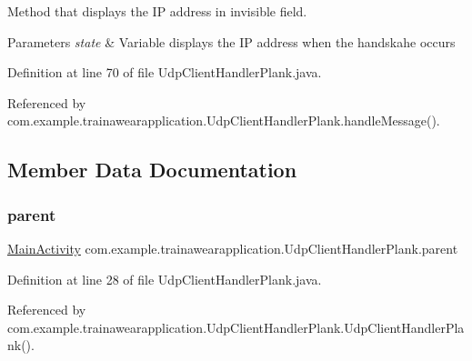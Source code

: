 Method that displays the IP address in invisible field. 


\begin{DoxyParams}{Parameters}
{\em state} & Variable displays the IP address when the handskahe occurs \\
\hline
\end{DoxyParams}


Definition at line 70 of file Udp\+Client\+Handler\+Plank.\+java.


\begin{DoxyCode}{0}

\end{DoxyCode}


Referenced by com.\+example.\+trainawearapplication.\+Udp\+Client\+Handler\+Plank.\+handle\+Message().



\subsection{Member Data Documentation}
\mbox{\label{classcom_1_1example_1_1trainawearapplication_1_1_udp_client_handler_plank_a4ae127059889ca5270670220bb58b613}} 
\subsubsection{\texorpdfstring{parent}{parent}}
{\footnotesize\ttfamily \mbox{\hyperlink{classcom_1_1example_1_1trainawearapplication_1_1_main_activity}{Main\+Activity}} com.\+example.\+trainawearapplication.\+Udp\+Client\+Handler\+Plank.\+parent\hspace{0.3cm}{\ttfamily [private]}}



Definition at line 28 of file Udp\+Client\+Handler\+Plank.\+java.



Referenced by com.\+example.\+trainawearapplication.\+Udp\+Client\+Handler\+Plank.\+Udp\+Client\+Handler\+Plank().

